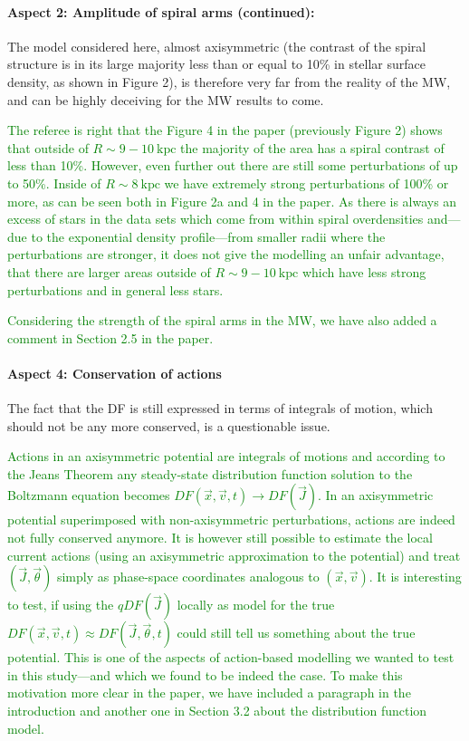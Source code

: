 \documentclass[10pt,a4paper]{article}
\newcommand{\Answer}[1]{\textcolor{Green}{#1}}
\begin{document}
\paragraph{Aspect 2: Amplitude of spiral arms (continued):} The model considered here, almost axisymmetric (the contrast of the spiral structure is in its large majority less than or equal to 10\% in stellar surface density, as shown in Figure 2),  is therefore very far from the reality of the MW, and can be highly deceiving for the MW results to come.

\Answer{The referee is right that the Figure 4 in the paper (previously Figure 2) shows that outside of $R\sim9-10~\text{kpc}$ the majority of the area has a spiral contrast of less than 10\%. However, even further out there are still some perturbations of up to 50\%. Inside of $R\sim8~\text{kpc}$ we have extremely strong perturbations of 100\% or more, as can be seen both in Figure 2a and 4 in the paper. As there is always an excess of stars in the data sets which come from within spiral overdensities and---due to the exponential density profile---from smaller radii where the perturbations are stronger, it does not give the modelling an unfair advantage, that there are larger areas outside of $R\sim9-10~\text{kpc}$ which have less strong perturbations and in general less stars.}

\Answer{Considering the strength of the spiral arms in the MW, we have also added a comment in Section 2.5 in the paper.}

\paragraph{Aspect 4: Conservation of actions} The fact that the DF is still expressed in terms of integrals of motion, which should not be any more conserved, is a questionable issue.

\Answer{Actions in an axisymmetric potential are integrals of motions and according to the Jeans Theorem any steady-state distribution function solution to the Boltzmann equation becomes $DF(\vec{x},\vec{v},t) \longrightarrow DF(\vec{J})$. In an axisymmetric potential superimposed with non-axisymmetric perturbations, actions are indeed not fully conserved anymore. It is however still possible to estimate the local current actions (using an axisymmetric approximation to the potential) and treat $(\vec{J},\vec{\theta})$ simply as phase-space coordinates analogous to $(\vec{x},\vec{v})$. It is interesting to test, if using the $qDF(\vec{J})$ locally as model for the true $DF(\vec{x},\vec{v},t)\approx DF(\vec{J},\vec{\theta},t)$ could still tell us something about the true potential. This is one of the aspects of action-based modelling we wanted to test in this study---and which we found to be indeed the case. To make this motivation more clear in the paper, we have included a paragraph in the introduction and another one in Section 3.2 about the distribution function model.}
\end{document}
